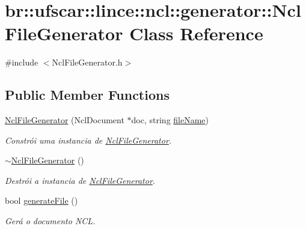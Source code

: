 \hypertarget{classbr_1_1ufscar_1_1lince_1_1ncl_1_1generator_1_1NclFileGenerator}{
\section{br::ufscar::lince::ncl::generator::NclFileGenerator Class Reference}
\label{classbr_1_1ufscar_1_1lince_1_1ncl_1_1generator_1_1NclFileGenerator}
}


{\ttfamily \#include $<$NclFileGenerator.h$>$}

\subsection*{Public Member Functions}
\begin{DoxyCompactItemize}
\item 
\hyperlink{classbr_1_1ufscar_1_1lince_1_1ncl_1_1generator_1_1NclFileGenerator_ae0efa881f57cb070eb0058164021057a}{NclFileGenerator} (NclDocument $\ast$doc, string \hyperlink{classbr_1_1ufscar_1_1lince_1_1ncl_1_1generator_1_1NclFileGenerator_a32edd0aef97357d73387db337d3329c5}{fileName})
\begin{DoxyCompactList}\small\item\em Constrói uma instancia de \hyperlink{classbr_1_1ufscar_1_1lince_1_1ncl_1_1generator_1_1NclFileGenerator}{NclFileGenerator}. \item\end{DoxyCompactList}\item 
\hyperlink{classbr_1_1ufscar_1_1lince_1_1ncl_1_1generator_1_1NclFileGenerator_a425e6d02060ed52727362a3fb26b0155}{$\sim$NclFileGenerator} ()
\begin{DoxyCompactList}\small\item\em Destrói a instancia de \hyperlink{classbr_1_1ufscar_1_1lince_1_1ncl_1_1generator_1_1NclFileGenerator}{NclFileGenerator}. \item\end{DoxyCompactList}\item 
bool \hyperlink{classbr_1_1ufscar_1_1lince_1_1ncl_1_1generator_1_1NclFileGenerator_ad7cab5c73d2f56107f0152d37edc8ac6}{generateFile} ()
\begin{DoxyCompactList}\small\item\em Gerá o documento NCL. \item\end{DoxyCompactList}\end{DoxyCompactItemize}
